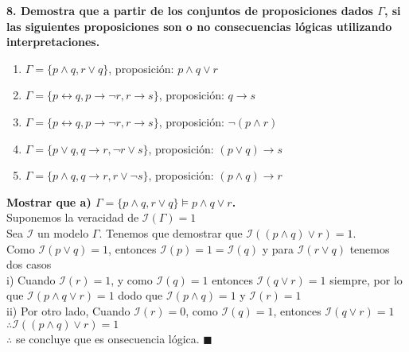 \textbf{8. Demostra que a partir de los conjuntos de proposiciones dados $\Gamma$, si las siguientes proposiciones son o no consecuencias lógicas utilizando interpretaciones.}
\begin{multicols}{2}
	\begin{enumerate}[label=\alph*)]
		\item $\Gamma = \{p\land q, r\lor q\}$, proposición: $p \land q\lor r$
		\item $\Gamma = \{p\leftrightarrow q,p\rightarrow \neg r,r\rightarrow s\}$, proposición: $q\rightarrow s$
		\item $\Gamma = \{p\leftrightarrow q,p\rightarrow \neg r,r\rightarrow s\}$, proposición: $\neg (p\land r)$
		\item $\Gamma = \{p\lor q, q\rightarrow r, \neg r \lor s\}$, proposición: $(p\lor q)\rightarrow s$
		\item $\Gamma = \{p\land q, q\rightarrow r, r \lor \neg s\}$, proposición: $(p \land q)\rightarrow r$
	\end{enumerate}
\end{multicols}

\textbf{Mostrar que a) 	$\Gamma=\{p\land q, r\lor q\} \vDash p \land q\lor r$.}\\
Suponemos la veracidad de $\mathcal{I}(\Gamma)=1$\\
Sea $\mathcal{I}$ un modelo $\Gamma$. Tenemos que demostrar que $\mathcal{I}((p \land q)\lor r)=1$.\\
Como $\mathcal{I}(p\lor q)=1$, entonces $\mathcal{I}(p)=1=\mathcal{I}(q)$ y para $\mathcal{I}(r\lor q)$ tenemos dos casos\\
\indent i) Cuando $\mathcal{I}(r)=1$, y como $\mathcal{I}(q)=1$ entonces $\mathcal{I}(q\lor r)=1$ siempre, por lo que $\mathcal{I}(p \land q\lor r)=1$ dodo que $\mathcal{I}(p \land q)=1$ y $\mathcal{I}(r)=1$\\
\indent ii) Por otro lado, Cuando $\mathcal{I}(r)=0$, como $\mathcal{I}(q)=1$, entonces $\mathcal{I}(q\lor r)=1$\\
$\therefore \mathcal{I}((p\land q)\lor r)=1$\\
\indent
$\therefore$ se concluye que es onsecuencia lógica. $\blacksquare$
\vspace{10px}

